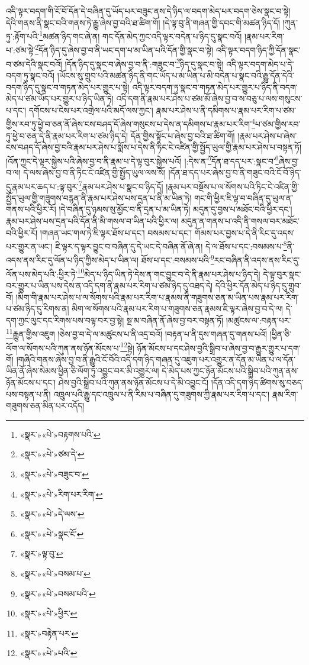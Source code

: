 འདི་ལྟར་བདག་གི་ངོ་བོ་དོན་དེ་བཞིན་དུ་ཡོད་པར་བཟུང་ནས་དེ་ཉིད་ལ་བདག་མེད་པར་བདག་ཅེས་སྣང་བ་སྟེ། དེའི་གནས་ནི་སྣང་བའི་གནས་ཏེ་རྒྱུ་ཞེས་བྱ་བའི་ཐ་ཚིག་གོ། །དེ་ལྟ་བུ་ནི་གཞན་གྱི་དབང་གི་མཚན་ཉིད་དོ། །ཀུན་ཏུ་:རྟོག་པའི་\footnote{«སྣར་»«པེ་»བརྟགས་པའི་}མཚན་ཉིད་གང་ཞེ་ན། གང་དོན་མེད་ཀྱང་འདི་ལྟར་བདེན་པ་ཉིད་དུ་སྣང་བའོ། །རྣམ་པར་རིག་པ་:ཙམ་སྟེ་\footnote{«སྣར་»«པེ་»ཙམ་དེ་}དོན་ཉིད་དུ་ཞེས་བྱ་བ་ནི་ཡང་དག་པ་མ་ཡིན་པའི་དོན་གྱི་སྣང་བ་སྟེ། འདི་ལྟར་བདག་ཉིད་ཀྱི་དོན་སྣང་བ་ཙམ་དེའི་སྣང་བའོ། །དོན་ཉིད་དུ་སྣང་བ་ཞེས་བྱ་བ་ནི་:གཟུང་བ་\footnote{«སྣར་»«པེ་»བཟུང་བ་}ཉིད་དུ་སྣང་བ་སྟེ། འདི་ལྟར་བདག་མེད་པ་དེ་བདག་ཏུ་སྣང་བའོ། །ཡོངས་སུ་གྲུབ་པའི་མཚན་ཉིད་ནི་གང་ཡོད་པ་མ་ཡིན་པ་མི་བདེན་པ་སྣང་བའི་རྒྱུ་དོན་དེའི་བདག་ཉིད་དུ་སྣང་བ་གཏན་མེད་པར་གྱུར་པ་སྟེ། འདི་ལྟར་བདག་ཏུ་སྣང་བ་གཏན་མེད་པར་གྱུར་པ་ཉིད་ནི་བདག་མེད་པ་ཙམ་ཡོད་པར་གྱུར་པ་ཉིད་ཡིན་ཏེ། འདི་དག་ནི་རྣམ་པར་ཤེས་པ་ཙམ་མོ་ཞེས་བྱ་བ་ས་བཅུ་པ་ལས་གསུངས་པ་དང་། དགོངས་པ་ངེས་པར་འགྲེལ་པའི་མདོ་ལས་ཀྱང་། རྣམ་པར་ཤེས་པ་ནི་དམིགས་པ་རྣམ་པར་རིག་པ་ཙམ་གྱིས་རབ་ཏུ་ཕྱེ་བ་ཅན་ནོ་ཞེས་ངས་བཤད་དོ་ཞེས་གསུངས་པ་དེས་ན་དམིགས་པ་རྣམ་པར་རིག་\footnote{«སྣར་»«པེ་»རིག་པར་རིག་}པ་ཙམ་གྱིས་རབ་ཏུ་ཕྱེ་བ་ཅན་དེ་ནི་རྣམ་པར་རིག་པ་ཙམ་ཉིད་དེ། དོན་གྱིས་སྟོང་པ་ཞེས་བྱ་བའི་ཐ་ཚིག་གོ། །རྣམ་པར་ཤེས་པ་ཞེས་ངས་བཤད་དོ་ཞེས་བྱ་བའི་རྣམ་པར་ཤེས་པ་སྨོས་པ་དེས་ནི་ཏིང་ངེ་འཛིན་གྱི་སྤྱོད་ཡུལ་གྱི་རྣམ་པར་ཤེས་པ་བསྟན་ཏོ། །འོན་ཀྱང་དེ་ལྟར་སྐྱེས་པའི་ཞེས་བྱ་བ་ནི་རྣམ་པ་དེ་ལྟ་བུར་སྐྱེས་པའོ། །:དེས་ན་\footnote{«སྣར་»«པེ་»དེ་ལས་}དོན་ཐ་དད་པར་:སྣང་བ་\footnote{«སྣར་»«པེ་»སྣང་ངོ་}ཞེས་བྱ་བ་ལ། དེ་ལས་ཞེས་བྱ་བ་ནི་ཏིང་ངེ་འཛིན་གྱི་སྤྱོད་ཡུལ་ལས་སོ། །དོན་ཐ་དད་པར་ཞེས་བྱ་བ་ནི་གཟུང་བའི་ངོ་བོ་ཉིད་དུ་རྣམ་པར་ཆད་པ་:ལྟ་བུར་\footnote{«སྣར་»ལྟ་བུ་}རྣམ་པར་ཤེས་པ་སྣང་བ་ཉིད་དོ། །རྣམ་པར་བསྔོས་པ་ལ་སོགས་པའི་ཏིང་ངེ་འཛིན་གྱི་སྤྱོད་ཡུལ་གྱི་གཟུགས་བརྙན་ནི་རྣམ་པར་ཤེས་པས་དྲན་པ་ནི་མ་ཡིན་ཏེ། གང་གི་ཕྱིར་ཇི་ལྟ་བ་བཞིན་དུ་ཡུལ་ན་གནས་པའི་ཕྱིར་རོ། །དེ་བཞིན་དུ་ཉམས་སུ་མྱོང་བ་ནི་དྲན་པ་མ་ཡིན་ཏེ། མདུན་དུ་བྱས་པ་མཐོང་བའི་ཕྱིར་དང་། རྣམ་པར་ཤེས་པས་དྲན་པའི་དོན་ནི་མི་གསལ་བ་ཡིན་པའི་ཕྱིར་ལ། མདུན་ན་གནས་པ་འདི་ནི་གསལ་བར་མཐོང་བའི་ཕྱིར་རོ། །གཞན་ཡང་གལ་ཏེ་ཇི་ལྟར་ཐོས་པ་དང་། བསམས་པ་དང་། གོམས་པར་བྱས་པ་དེ་ནི་རིང་དུ་འདས་པར་གྱུར་ན་ཡང་། ཇི་ལྟར་ད་ལྟར་བྱུང་བ་བཞིན་དུ་དེ་ཡང་དེ་བཞིན་ནོ་ཞེ་ན། དེ་ལ་ཐོས་པ་དང་:བསམས་པ་\footnote{«སྣར་»«པེ་»བསམ་པ་}ནི་འདས་ནས་རིང་དུ་ལོན་པ་ཉིད་ཀྱིས་མེད་པ་ཡིན་ལ། ཐོས་པ་དང་:བསམས་པའི་\footnote{«སྣར་»«པེ་»བསམ་པའི་}རང་བཞིན་ནི་འདས་ནས་རིང་དུ་ལོན་པས་མེད་པའི་:ཕྱིར་ཏེ་\footnote{«སྣར་»«པེ་»ཕྱིར་}མེད་པ་ཉིད་ཡིན་ཏེ་དེས་ན་གང་བྱུང་བ་དེ་ནི་རྣམ་པར་ཤེས་པ་ཉིད་དེ། དེ་ལྟ་བུར་སྣང་བར་གྱུར་པ་ཡིན་པས་དེས་ན་འདི་དག་ནི་རྣམ་པར་རིག་པ་ཙམ་ཉིད་དུ་འཐད་དེ། དེའི་ཕྱིར་དོན་མེད་པ་ཉིད་དུ་གྲུབ་བོ། །མིག་གི་རྣམ་པར་ཤེས་པ་ལ་སོགས་པའི་རྣམ་པར་རིག་པ་རྣམས་ནི་གཟུགས་ཅན་མ་ཡིན་པས་རྣམ་པར་རིག་པ་ཙམ་ཉིད་དུ་རིགས་ན། མིག་ལ་སོགས་པའི་རྣམ་པར་རིག་པ་གཟུགས་ཅན་རྣམས་ཇི་ལྟར་ཞེས་བྱ་བ་དེ་ལ། དེ་དག་ཀྱང་ལུང་དང་རིགས་པས་བལྟ་བར་བྱ་སྟེ། སྔ་མ་བཞིན་ནོ་ཞེས་བྱ་བར་བསྟན་ཏོ། །མཚུངས་ལ་:བརྟན་པར་\footnote{«སྣར་»བརྟེན་པར་}རྒྱུན་གྱིས་འཇུག །ཅེས་བྱ་བ་དེ་ལ་མཚུངས་པ་ནི་འདྲ་བའོ། །བརྟན་པ་ནི་དུས་གཞན་དུ་གནས་པའོ། །ཕྱིན་ཅི་ལོག་ལ་སོགས་པའི་ཀུན་ནས་ཉོན་མོངས་པ་\footnote{«སྣར་»«པེ་»པའི་}སྟེ། ཉོན་མོངས་པ་དང་ཤེས་བྱའི་སྒྲིབ་པ་ཞེས་བྱ་བ་རྒྱུར་གྱུར་པ་དག་གོ། །གཞིའི་གནས་ཞེས་བྱ་བ་ནི་རྒྱུའི་ངོ་བོའི་འདི་དག་ཉིད་གཞན་དུ་འཇུག་པར་འགྱུར་ན་དོན་མ་ཡིན་པ་ལ་དོན་ཡིན་ནོ་ཞེས་སེམས་ཕྱིན་ཅི་ལོག་ཏུ་འབྱུང་བར་མི་འགྱུར་ལ། དེ་མེད་པས་ཀྱང་ཉོན་མོངས་པའི་སྒྲིབ་པའི་ཀུན་ནས་ཉོན་མོངས་པ་དང་། ཤེས་བྱའི་སྒྲིབ་པའི་ཀུན་ནས་ཉོན་མོངས་པ་དེ་མི་འབྱུང་ངོ། །དོན་འདི་དག་ཉིད་ཚིགས་སུ་བཅད་པས་བསྟན་པ་ནི། འཁྲུལ་པའི་རྒྱུ་དང་འཁྲུལ་པ་ནི་རིམ་པ་བཞིན་དུ་གཟུགས་ཀྱི་རྣམ་པར་རིག་པ་དང་། རྣམ་རིག་གཟུགས་ཅན་མིན་པར་འདོད། 